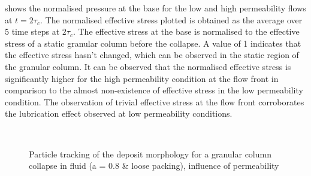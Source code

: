  shows the normalised pressure at the 
base for the low and high permeability flows at $ t = 2\tau_c$. The normalised 
effective stress plotted is obtained as the average over 5 time steps at 
$2\tau_c$. The effective stress at the base is normalised to the effective 
stress of a static granular column before the collapse. A value of 1 indicates 
that the effective stress hasn't changed, which can be observed in the static 
region of the granular column. It can be observed that the normalised effective 
stress is significantly higher for the high permeability condition at the flow 
front in comparison to the almost non-existence of effective stress in the low 
permeability condition. The observation of trivial effective stress at the flow 
front corroborates the lubrication effect observed at low permeability 
conditions.

\begin{figure}
\centering
{}\\
\caption{Particle tracking of the deposit morphology
for a granular column collapse in fluid (a = 0.8 \& loose packing), influence 
of permeability}
\label{fig:Loose_a08_permeability}
\end{figure}

